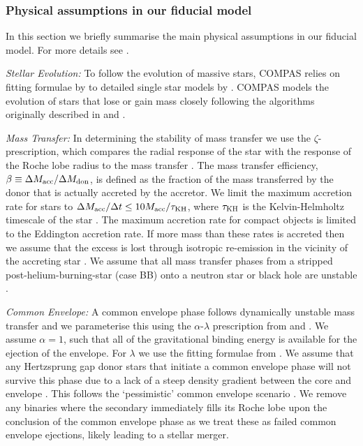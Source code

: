 \subsubsection{Physical assumptions in our fiducial model}\label{sec:fiducial_physics}
In this section we briefly summarise the main physical assumptions in our fiducial model. For more details see \citet{Broekgaarden+2021}.

\textit{Stellar Evolution:} To follow the evolution of massive stars, COMPAS relies on fitting formulae by \citet{Hurley+2000} to detailed single star models by \citet{Pols+1998}. COMPAS models the evolution of stars that lose or gain mass closely following the algorithms originally described in \citet{Tout+1996} and \citet{Hurley+2002}.

\textit{Mass Transfer:} In determining the stability of mass transfer we use the $\zeta$-prescription, which compares the radial response of the star with the response of the Roche lobe radius to the mass transfer \citep[e.g.][]{Hjellming+1987}. The mass transfer efficiency, $\beta \equiv \Delta M_{\rm acc} / \Delta M_{\rm don}$, is defined as the fraction of the mass transferred by the donor that is actually accreted by the accretor. We limit the maximum accretion rate for stars to $\Delta M_{\rm acc} / \Delta t \le 10 M_{\rm acc} / \tau_{\rm KH}$, where $\tau_{\rm KH}$ is the Kelvin-Helmholtz timescale of the star \citep{Paczynski+1972, Hurley+2002}. The maximum accretion rate for compact objects is limited to the Eddington accretion rate. If more mass than these rates is accreted then we assume that the excess is lost through isotropic re-emission in the vicinity of the accreting star \citep[e.g.][]{Massevitch+1975, Soberman+1997}. We assume that all mass transfer phases from a stripped post-helium-burning-star (case BB) onto a neutron star or black hole are unstable \citep{Tauris+2015}.

\textit{Common Envelope:} A common envelope phase follows dynamically unstable mass transfer and we parameterise this using the $\alpha$-$\lambda$ prescription from \citet{Webbink+1984} and \citet{deKool+1990}. We assume $\alpha = 1$, such that all of the gravitational binding energy is available for the ejection of the envelope. For $\lambda$ we use the fitting formulae from \citet{Xu+2010, Xu+2010a}. We assume that any Hertzsprung gap donor stars that initiate a common envelope phase will not survive this phase due to a lack of a steep density gradient between the core and envelope \citep{Taam+2000, Ivanova+2004, Klencki+2021}. This follows the `pessimistic' common envelope scenario \citep[c.f.][]{Belczynski+2007}. We remove any binaries where the secondary immediately fills its Roche lobe upon the conclusion of the common envelope phase as we treat these as failed common envelope ejections, likely leading to a stellar merger.

